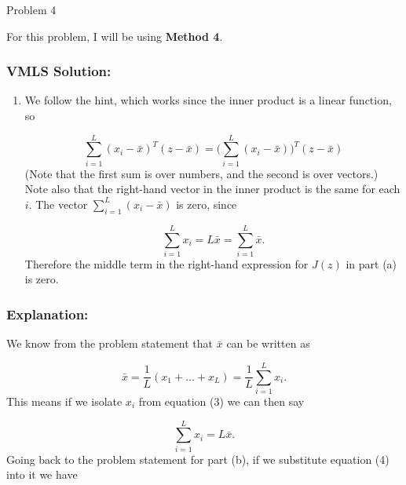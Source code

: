 \begin{problem}{Problem 4}
    \begin{highlight}
        \noindent For this problem, I will be using \textbf{Method 4}.

        \subsubsection*{VMLS Solution:}

        \begin{enumerate}[label = (\alph*), start = 2]
            \item We follow the hint, which works since the inner product is a linear function, so
            
            \begin{equation*}
                \sum^{L}_{i = 1} (x_{i} - \bar{x})^{T}(z - \bar{x}) = \Bigg(\sum^{L}_{i = 1} (x_{i} - \bar{x})\Bigg)^{T}(z - \bar{x})
            \end{equation*}
            (Note that the first sum is over numbers, and the second is over vectors.) Note also that the right-hand vector in the inner product is the same for each $i$. The vector 
            $\sum^{L}_{i = 1}(x_{i} - \bar{x})$ is zero, since
            
            \begin{equation*}
                \sum^{L}_{i = 1} x_{i} = L \bar{x} = \sum^{L}_{i = 1} \bar{x}.
            \end{equation*}
            Therefore the middle term in the right-hand expression for $J(z)$ in part (a) is zero.
        \end{enumerate}

        \subsubsection*{Explanation:}

        We know from the problem statement that $\bar{x}$ can be written as 

        \begin{equation}
            \bar{x} = \frac{1}{L}(x_{1} + \dots + x_{L}) = \frac{1}{L} \sum^{L}_{i = 1} x_{i}.
        \end{equation}
        This means if we isolate $x_{i}$ from equation (3) we can then say 

        \begin{equation}
            \sum^{L}_{i = 1}x_{i} = L \bar{x}.
        \end{equation}
        Going back to the problem statement for part (b), if we substitute equation (4) into it we have 


\end{highlight}
\end{problem}
